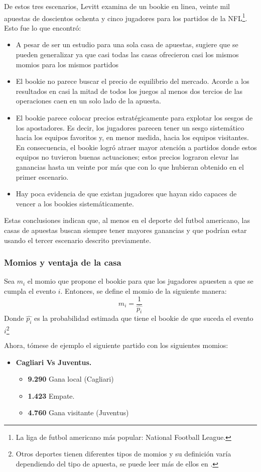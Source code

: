 De estos tres escenarios, Levitt \cite{levitt2004gambling} examina de un bookie en linea, veinte mil apuestas de doscientos ochenta y cinco jugadores para los partidos de la NFL\footnote{La liga de futbol americano más popular: National Football League.}. Esto fue lo que encontró:
\begin{itemize}
	\item A pesar de ser un estudio para una sola casa de apuestas, sugiere que se pueden generalizar ya que casi todas las casas ofrecieron casi los mismos momios para los mismos partidos
	\item El bookie no parece buscar el precio de equilibrio del mercado. Acorde a los resultados en casi la mitad de todos los juegos al menos dos tercios de las operaciones caen en un solo lado de la apuesta.
	\item El bookie parece colocar precios estratégicamente para explotar los sesgos de los apostadores. Es decir, los jugadores parecen tener un sesgo sistemático hacia los equipos favoritos y, en menor medida, hacia los equipos visitantes. En consecuencia, el bookie logró atraer mayor atención a partidos donde estos equipos no tuvieron buenas actuaciones; estos precios lograron elevar las ganancias hasta un veinte por más que con lo que hubieran obtenido en el primer escenario.
	\item Hay poca evidencia de que existan jugadores que hayan sido capaces de vencer a los bookies sistemáticamente.
 \end{itemize}
 
Estas conclusiones indican que, al menos en el deporte del futbol americano, las casas de apuestas buscan siempre tener mayores ganancias y que podrían estar usando el tercer escenario descrito previamente. 

\subsubsection{Momios y ventaja de la casa}
Sea $m_i$ el momio que propone el bookie para que los jugadores apuesten a que se cumpla el evento $i$. Entonces, se define el momio de la siguiente manera:
\[m_i = \frac{1}{\hat{p_i}}\]
Donde $\hat{p_i}$ es la probabilidad estimada que tiene el bookie de que suceda el evento $i$\footnote{Otros deportes tienen diferentes tipos de momios y su definición varía dependiendo del tipo de apuesta, se puede leer más de ellos en \cite{ignatin1984sports}.}

Ahora, tómese de ejemplo el siguiente partido con los siguientes momios:
\begin{itemize}

\item \textbf{Cagliari Vs Juventus.}
	\begin{itemize}
		\item \textbf{9.290} Gana local (Cagliari)
		\item \textbf{1.423} Empate.
		\item \textbf{4.760} Gana visitante (Juventus)
	\end{itemize}
\end{itemize}

